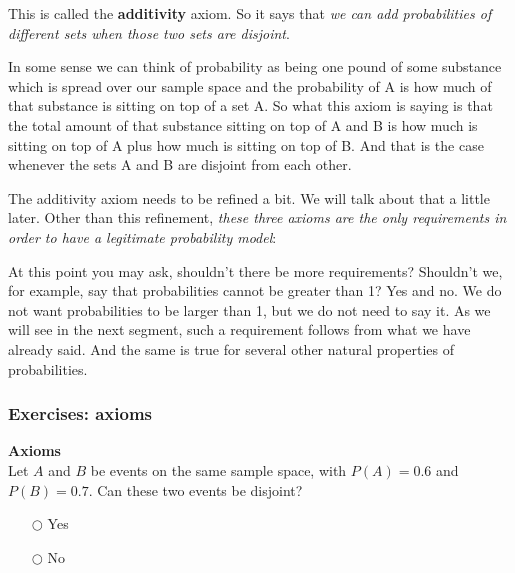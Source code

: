 \documentclass[pdftex, brazil, 12pt, twoside]{article}
\begin{document}
This is called the \textbf{additivity} axiom.
So it says that \emph{we can add probabilities of different
sets when those two sets are disjoint}.

In some sense we can think of probability as being one pound
of some substance which is spread over our sample space
and the probability of A is how much of that substance is
sitting on top of a set A. So what this axiom is saying is
that the total amount of that substance sitting on top of A
and B is how much is sitting on top of A plus how much is
sitting on top of B. And that is the case whenever the sets
A and B are disjoint from each other.

The additivity axiom needs to be refined a bit.
We will talk about that a little later.
Other than this refinement, \emph{these three axioms are the
only requirements in order to have a
legitimate probability model}:

\begin{figure}[H]
  \begin{center}
  \end{center}
\end{figure}

At this point you may ask, shouldn't there be more
requirements?
Shouldn't we, for example, say that probabilities cannot be
greater than 1?
Yes and no.
We do not want probabilities to be larger than 1, but we do
not need to say it.
As we will see in the next segment, such a requirement
follows from what we have already said.
And the same is true for several other natural
properties of probabilities.

\subsubsection{Exercises: axioms}
\label{un1-lec1-exec-axioms}

\begin{exercise}
  \textbf{Axioms}\\
  Let $A$ and $B$ be events on the same sample space, with $P(A)=0.6$ and
  $P(B)=0.7$. Can these two events be disjoint?

  \begin{itemize}[noitemsep]
  \item[$\bigcirc$] Yes
  \item[$\bigcirc$] No
  \end{itemize}
\end{exercise}
\end{document}
